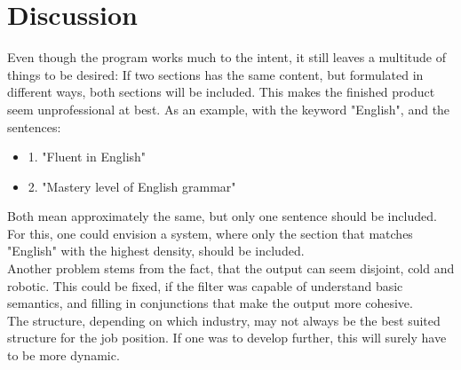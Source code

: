 \section{Discussion}\label{sec:discussion}
Even though the program works much to the intent, it still leaves a multitude of things to be desired:
If two sections has the same content, but formulated in different ways, both sections will be included.
This makes the finished product seem unprofessional at best. As an example, with the keyword "English", and the sentences:
\begin{itemize}
  \item 1. "Fluent in English"
  \item 2. "Mastery level of English grammar"
\end{itemize}
Both mean approximately the same, but only one sentence should be included. For this, one could envision a system, where only the section that matches "English" with the highest density, should be included.\\

Another problem stems from the fact, that the output can seem disjoint, cold and robotic. This could be fixed, if the filter was capable of understand basic semantics, and filling in conjunctions that make the output more cohesive.\\

The structure, depending on which industry, may not always be the best suited structure for the job position. If one was to develop further, this will surely have to be more dynamic.\\